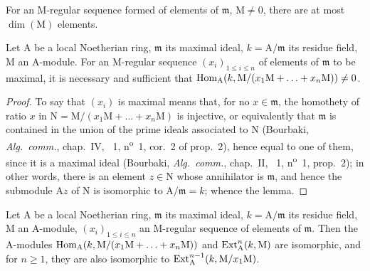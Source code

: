 For an $\mathrm{M}$-regular sequence formed of elements of $\mathfrak{m}$, $\mathrm{M}\neq 0$, there are at most $\dim(\mathrm{M})$ elements.

\begin{lemma}[16.4.2]
\label{0.16.4.2}
Let $\mathrm{A}$ be a local Noetherian ring, $\mathfrak{m}$ its maximal ideal, $k=\mathrm{A}/\mathfrak{m}$ its residue field, $\mathrm{M}$ an $\mathrm{A}$-module.
For an $\mathrm{M}$-regular sequence $(x_i)_{1\leq i\leq n}$ of elements of $\mathfrak{m}$ to be maximal, it is necessary and sufficient that $\operatorname{Hom}_\mathrm{A}(k,\mathrm{M}/(x_1\mathrm{M}+\ldots+x_n\mathrm{M}))\neq 0$.
\end{lemma}

\begin{proof}
To say that $(x_i)$ is maximal means that, for no $x\in\mathfrak{m}$, the homothety of ratio $x$ in $\mathrm{N}=\mathrm{M}/(x_1\mathrm{M}+\ldots+x_n\mathrm{M})$ is injective, or equivalently that $\mathfrak{m}$ is contained in the union of the prime ideals associated to $\mathrm{N}$ (Bourbaki, \emph{Alg.~comm.}, chap.~IV, \textsection~1, n\textsuperscript{o}~1, cor.~2 of prop.~2), hence equal to one of them, since it is a  maximal ideal (Bourbaki, \emph{Alg.~comm.}, chap.~II, \textsection~1, n\textsuperscript{o}~1, prop.~2); in other words, there is an element $z\in\mathrm{N}$ whose annihilator is $\mathfrak{m}$, and hence the submodule $\mathrm{A}z$ of $\mathrm{N}$ is isomorphic to $\mathrm{A}/\mathfrak{m}=k$; whence the lemma.
\end{proof}

\begin{lemma}[16.4.3]
\label{0.16.4.3}
Let $\mathrm{A}$ be a local Noetherian ring, $\mathfrak{m}$ its maximal ideal, $k=\mathrm{A}/\mathfrak{m}$ its residue field, $\mathrm{M}$ an $\mathrm{A}$-module, $(x_i)_{1\leq i\leq n}$ an $\mathrm{M}$-regular sequence of elements of $\mathfrak{m}$.
Then the $\mathrm{A}$-modules $\operatorname{Hom}_\mathrm{A}(k,\mathrm{M}/(x_1\mathrm{M}+\ldots+x_n\mathrm{M}))$ and $\operatorname{Ext}^n_\mathrm{A}(k,\mathrm{M})$ are isomorphic, and for $n\geq 1$, they are also isomorphic to $\operatorname{Ext}^{n-1}_\mathrm{A}(k,\mathrm{M}/x_1\mathrm{M})$.
\end{lemma}

